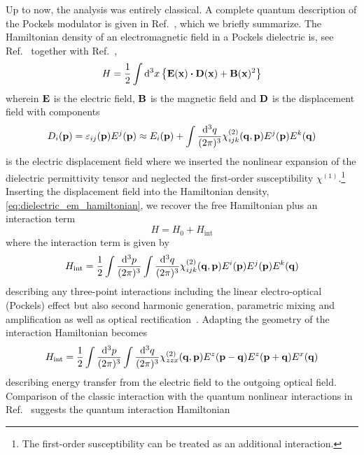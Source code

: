 Up to now, the analysis was entirely classical.
A complete quantum description of the Pockels modulator is given in Ref.~\cite{Horoshko2018}, which we briefly summarize.
The Hamiltonian density of an electromagnetic field in a Pockels dielectric is, see Ref.~\cite[p.~21]{Vogel2006} together with Ref.~\cite[p.~124]{Jackson2007},
\begin{equation}
	H
	=
	\frac{1}{2}
	\int\dd[3]{x}
	\left\{
		\vb{E}(\vb{x})
		\vdot
		\vb{D}(\vb{x})
		+
		\vb{B}(\vb{x})^2
	\right\}
	\label{eq:dielectric_em_hamiltonian}
\end{equation}
wherein $\vb{E}$ is the electric field, $\vb{B}$ is the magnetic field and $\vb{D}$ is the displacement field with components
\begin{equation}
	D_i(\vb{p})
	=
	\varepsilon_{ij}(\vb{p})
	E^j(\vb{p})
	\approx
	E_i(\vb{p})
	+
	\int\frac{\dd[3]{q}}{(2\pi)^3}
	\chi_{ijk}^{(2)}(\vb{q},\vb{p})
	E^j(\vb{p})
	E^k(\vb{q})
\end{equation}
is the electric displacement field where we inserted the nonlinear expansion of the dielectric permittivity tensor and neglected the first-order susceptibility $\chi^{(1)}$.\footnote{The first-order susceptibility can be treated as an additional interaction.}
Inserting the displacement field into the Hamiltonian density, \cref{eq:dielectric_em_hamiltonian}, we recover the free Hamiltonian plus an interaction term
\begin{equation}
	H
	=
	H_0
	+
	H_\text{int}
\end{equation}
where the interaction term is given by
\begin{equation}
	H_\text{int}
	=	
	\frac{1}{2}
	\int\frac{\dd[3]{p}}{(2\pi)^3}
	\int\frac{\dd[3]{q}}{(2\pi)^3}
	\chi_{ijk}^{(2)}(\vb{q},\vb{p})
	E^i(\vb{p})
	E^j(\vb{p})
	E^k(\vb{q})	
\end{equation}
describing any three-point interactions including the linear electro-optical (Pockels) effect but also second harmonic generation, parametric mixing and amplification as well as optical rectification~\cite[p.~14]{Murti2014}.
Adapting the geometry of  the interaction Hamiltonian becomes
\begin{equation}
	H_\text{int}
	=	
	\frac{1}{2}
	\int\frac{\dd[3]{p}}{(2\pi)^3}
	\int\frac{\dd[3]{q}}{(2\pi)^3}
	\chi_{zzx}^{(2)}(\vb{q},\vb{p})
	E^z(\vb{p}-\vb{q})
	E^z(\vb{p}+\vb{q})
	E^x(\vb{q})	
\end{equation}
describing energy transfer from the electric field to the outgoing optical field.
Comparison of the classic interaction with the quantum nonlinear interactions in Ref.~\cite[p.~33]{QuesadaMejia2015} suggests the quantum interaction Hamiltonian
